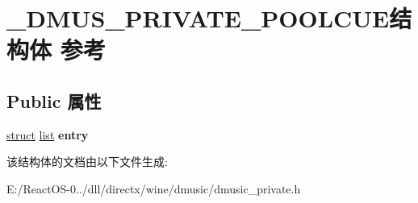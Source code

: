 \hypertarget{struct___d_m_u_s___p_r_i_v_a_t_e___p_o_o_l_c_u_e}{}\section{\+\_\+\+D\+M\+U\+S\+\_\+\+P\+R\+I\+V\+A\+T\+E\+\_\+\+P\+O\+O\+L\+C\+U\+E结构体 参考}
\label{struct___d_m_u_s___p_r_i_v_a_t_e___p_o_o_l_c_u_e}
\subsection*{Public 属性}
\begin{DoxyCompactItemize}
\item 
\mbox{\label{struct___d_m_u_s___p_r_i_v_a_t_e___p_o_o_l_c_u_e_a1950fed96f54022e4bbfdfd418065b3d}} 
\hyperlink{interfacestruct}{struct} \hyperlink{classlist}{list} {\bfseries entry}
\end{DoxyCompactItemize}


该结构体的文档由以下文件生成\+:\begin{DoxyCompactItemize}
\item 
E\+:/\+React\+O\+S-\/0../dll/directx/wine/dmusic/dmusic\+\_\+private.\+h\end{DoxyCompactItemize}
